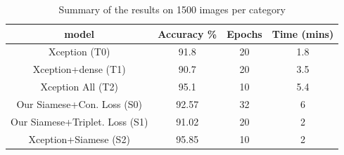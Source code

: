 \begin{table}[ht]
    \caption{Summary of the results on 1500 images per category} 
    \centering 
    \begin{tabular}{c c c c} 
    \hline\hline 
    
    model & Accuracy \% & Epochs & Time (mins)  \\%
    \hline %
    Xception (T0) & 91.8 & 20 & 1.8 \\%
    Xception+dense (T1) & 90.7 & 20 & 3.5 \\%
    Xception All (T2) & 95.1 & 10 & 5.4 \\%
    Our Siamese+Con. Loss (S0) & 92.57 & 32 & 6 \\%
    Our Siamese+Triplet. Loss (S1) & 91.02  & 20& 2 \\%
    Xception+Siamese (S2) & 95.85 & 10 & 2 \\%
    \hline 
    \end{tabular}
\label{table:resultA} %
\end{table}

